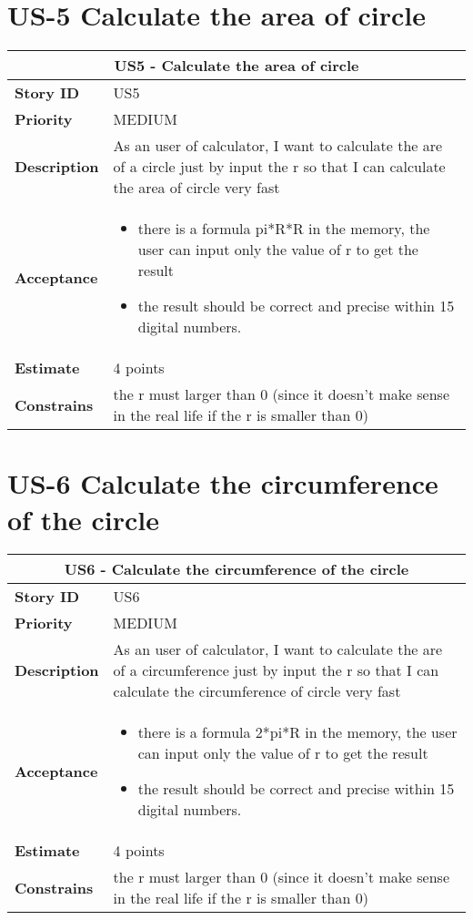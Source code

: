 \documentclass[12pt]{report}
\begin{document}
{		\section{US-5 Calculate the area of circle }
		\begin{tabular}{ |p{4cm}|p{10cm}| }
			\hline
			\multicolumn{2}{|c|}{US5 - Calculate the area of circle } \\
			\hline
			\textbf {Story ID}& US5  \\
			\hline
			\textbf{Priority} & MEDIUM \\
			\hline
			\textbf{Description}   & As an user of calculator, I want to calculate the are of a circle just by input the r so that I can calculate the area of circle very fast  \\
			\hline
			\textbf{Acceptance}& 
			\begin{itemize}
				\item  there is a formula pi*R*R in the memory, the user can input only the value of r to get the result 
				\item  the result should be correct and precise within 15 digital numbers.
			\end{itemize}
			\\
			\hline
			\textbf{Estimate} & 4 points   \\
			\hline
			\textbf{Constrains}& the r must larger than 0 (since it doesn't make sense in the real life if the r is smaller than 0) \\
			\hline
		\end{tabular}
		
		
		\section{US-6 Calculate the circumference of the circle}
		\begin{tabular}{ |p{4cm}|p{10cm}| }
			\hline
			\multicolumn{2}{|c|}{US6 - Calculate the circumference of the circle } \\
			\hline
			\textbf {Story ID}& US6 \\
			\hline
			\textbf{Priority} & MEDIUM \\
			\hline
			\textbf{Description}   & As an user of calculator, I want to calculate the are of a circumference just by input the r so that I can calculate the circumference of circle very fast  \\
			\hline
			\textbf{Acceptance}&
			\begin{itemize}
				\item  there is a formula 2*pi*R in the memory, the user can input only the value of r to get the result 
				\item  the result should be correct and precise within 15 digital numbers.
			\end{itemize}
			\\
			\hline
			\textbf{Estimate} & 4 points\\
			\hline
			\textbf{Constrains}& the r must larger than 0 (since it doesn't make sense in the real life if the r is smaller than 0)   \\
			\hline
		\end{tabular}
		
}
\end{document}
